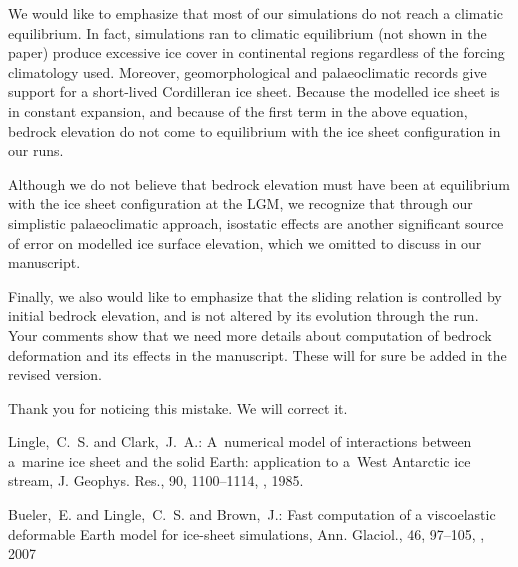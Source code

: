 \documentclass[10pt]{article}
\begin{document}
We would like to emphasize that most of our simulations do not reach a climatic equilibrium. In fact, simulations ran to climatic equilibrium (not shown in the paper) produce excessive ice cover in continental regions regardless of the forcing climatology used. Moreover, geomorphological and palaeoclimatic records give support for a short-lived Cordilleran ice sheet. Because the modelled ice sheet is in constant expansion, and because of the first term in the above equation, bedrock elevation do not come to equilibrium with the ice sheet configuration in our runs.

Although we do not believe that bedrock elevation must have been at equilibrium with the ice sheet configuration at the LGM, we recognize that through our simplistic palaeoclimatic approach, isostatic effects are another significant source of error on modelled ice surface elevation, which we omitted to discuss in our manuscript.

Finally, we also would like to emphasize that the sliding relation is controlled by initial bedrock elevation, and is not altered by its evolution through the run. Your comments show that we need more details about computation of bedrock deformation and its effects in the manuscript. These will for sure be added in the revised version.


Thank you for noticing this mistake. We will correct it.

\begin{thebibliography}{69}

Lingle,~C.~S. and Clark,~J.~A.: A~numerical model of interactions between a~marine ice sheet and the solid Earth: application to a~West Antarctic ice stream, J. Geophys. Res., 90, 1100--1114, , 1985.

Bueler,~E. and Lingle,~C.~S. and Brown,~J.: Fast computation of a viscoelastic deformable Earth model for ice-sheet simulations, Ann. Glaciol., 46, 97--105, , 2007

\end{thebibliography}

\end{document}
